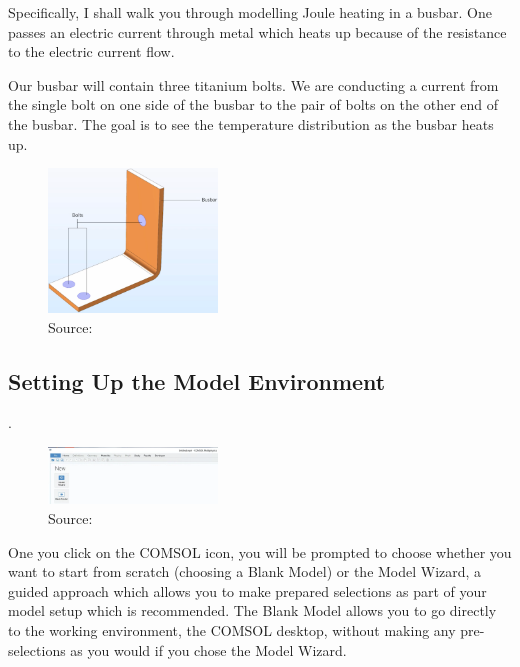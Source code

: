 Specifically, I shall walk you through modelling Joule heating in a busbar. One passes an electric current through metal which heats up because of the resistance to the electric current flow.

Our busbar will contain three titanium bolts. We are conducting a current from the single bolt on one side of the busbar to the pair of bolts on the other end of the busbar. The goal is to see the temperature distribution as the busbar heats up.


\begin{figure}[ht!]
  \centering
  \includegraphics[width=0.4\textwidth]{Chapters/Figures/Chapter 3 Figures/Busbar.png}
  \caption{ Source: \cite{}}
  \label{}
\end{figure}

\subsection{Setting Up the Model Environment}.
\begin{figure}[ht!]
  \centering
  \includegraphics[width=0.4\textwidth]{Chapters/Figures/Chapter 3 Figures/Set-up Screen.png}
  \caption{ Source: \cite{}}
  \label{}
\end{figure}

One you click on the COMSOL icon, you will be prompted to choose whether you want to start from scratch (choosing a Blank Model) or the Model Wizard, a guided approach which allows you to make prepared selections as part of your model setup which is recommended. The Blank Model allows you to go directly to the working environment, the COMSOL desktop, without making any pre-selections as you would if you chose the Model Wizard.

